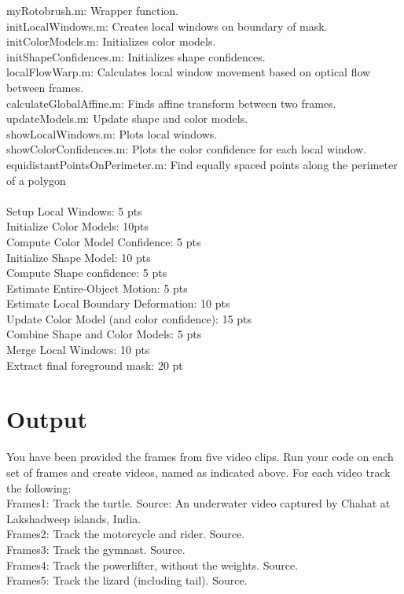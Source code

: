\documentclass[15pt]{article}
\begin{document}
myRotobrush.m: Wrapper function.\\
initLocalWindows.m: Creates local windows on boundary of mask.\\
initColorModels.m: Initializes color models.\\
initShapeConfidences.m: Initializes shape confidences.\\
localFlowWarp.m: Calculates local window movement based on optical flow between frames.\\
calculateGlobalAffine.m: Finds affine transform between two frames.\\
updateModels.m: Update shape and color models.\\
showLocalWindows.m: Plots local windows.\\
showColorConfidences.m: Plots the color confidence for each local window.\\
equidistantPointsOnPerimeter.m: Find equally spaced points along the perimeter of a polygon
\\~\\

Setup Local Windows: 5 pts\\
Initialize Color Models: 10pts\\
Compute Color Model Confidence: 5 pts\\
Initialize Shape Model: 10 pts\\
Compute Shape confidence: 5 pts\\
Estimate Entire-Object Motion: 5 pts\\
Estimate Local Boundary Deformation: 10 pts\\
Update Color Model (and color confidence): 15 pts\\
Combine Shape and Color Models: 5 pts\\
Merge Local Windows: 10 pts\\
Extract final foreground mask: 20 pt\\


\section{Output}
You have been provided the frames from five video clips. Run your code on each set of frames and create videos, named as indicated above. For each video track the following:
\\
Frames1: Track the turtle. Source: An underwater video captured by Chahat at Lakshadweep islands, India.\\
Frames2: Track the motorcycle and rider. Source.\\
Frames3: Track the gymnast. Source.\\
Frames4: Track the powerlifter, without the weights. Source.\\
Frames5: Track the lizard (including tail). Source.\\
\end{document}
